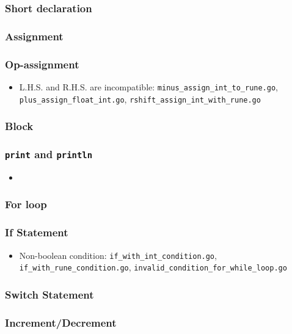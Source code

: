 \documentclass{article}
\begin{document}
\subsubsection*{Short declaration}
\subsubsection*{Assignment}
\subsubsection*{Op-assignment}

\begin{itemize}
\item L.H.S. and R.H.S. are incompatible: \texttt{minus_assign_int_to_rune.go}, \texttt{plus_assign_float_int.go}, \texttt{rshift_assign_int_with_rune.go}
\end{itemize}

\subsubsection*{Block}
\subsubsection*{\texttt{print} and \texttt{println}}

\begin{itemize}
\item 
\end{itemize}

\subsubsection*{For loop}
\subsubsection*{If Statement}

\begin{itemize}
\item Non-boolean condition: \texttt{if_with_int_condition.go}, \texttt{if_with_rune_condition.go}, \texttt{invalid_condition_for_while_loop.go}
\end{itemize}

\subsubsection*{Switch Statement}
\subsubsection*{Increment/Decrement}
\end{document}
